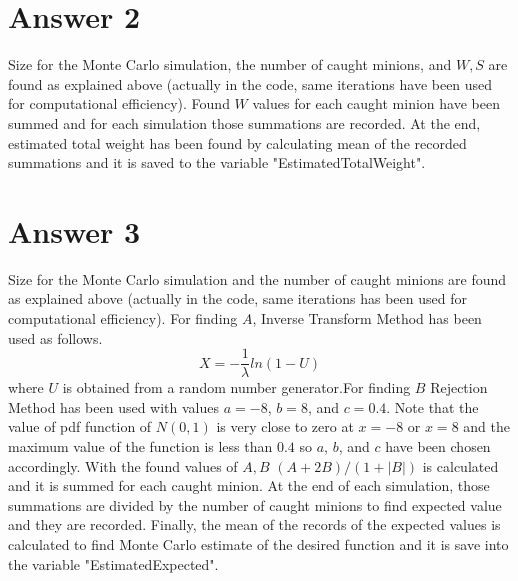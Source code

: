 \documentclass[12pt]{article}
\begin{document}
\section*{Answer 2}
Size for the Monte Carlo simulation, the number of caught minions, and $W, S$ are found as explained above (actually in the code, same iterations have been used for computational efficiency). Found $W$ values for each caught minion have been summed and for each simulation those summations are recorded. At the end, estimated total weight has been found by calculating mean of the recorded summations and it is saved to the variable "EstimatedTotalWeight".

\section*{Answer 3}
Size for the Monte Carlo simulation and the number of caught minions are found as explained above (actually in the code, same iterations has been used for computational efficiency). For finding $A$, Inverse Transform Method has been used as follows.
\begin{equation}
	X = -\frac{1}{\lambda}ln(1 - U)
\end{equation}
where $U$ is obtained from a random number generator.For finding $B$ Rejection Method has been used with values $a = -8$, $b = 8$, and $c = 0.4$. Note that the value of pdf function of $N(0, 1)$ is very close to zero at $x = -8$ or $x = 8$ and the maximum value of the function is less than $0.4$ so $a$, $b$, and $c$ have been chosen accordingly. With the found values of $A, B$ $(A + 2B)/(1 + |B|)$ is calculated and it is summed for each caught minion. At the end of each simulation, those summations are divided by the number of caught minions to find expected value and they are recorded. Finally, the mean of the records of the expected values is calculated to find Monte Carlo estimate of the desired function and it is save into the variable "EstimatedExpected".
\end{document}

